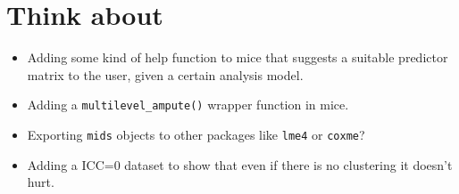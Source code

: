 \documentclass[
]{jss}
\begin{document}
\hypertarget{think-about}{%
\section{Think about}\label{think-about}}

\begin{itemize}
\item
  Adding some kind of help function to mice that suggests a suitable
  predictor matrix to the user, given a certain analysis model.
\item
  Adding a \texttt{multilevel\_ampute()} wrapper function in mice.
\item
  Exporting \texttt{mids} objects to other packages like \texttt{lme4}
  or \texttt{coxme}?
\item
  Adding a ICC=0 dataset to show that even if there is no clustering it
  doesn't hurt.
\end{itemize}

\renewcommand\refname{References}

\end{document}
